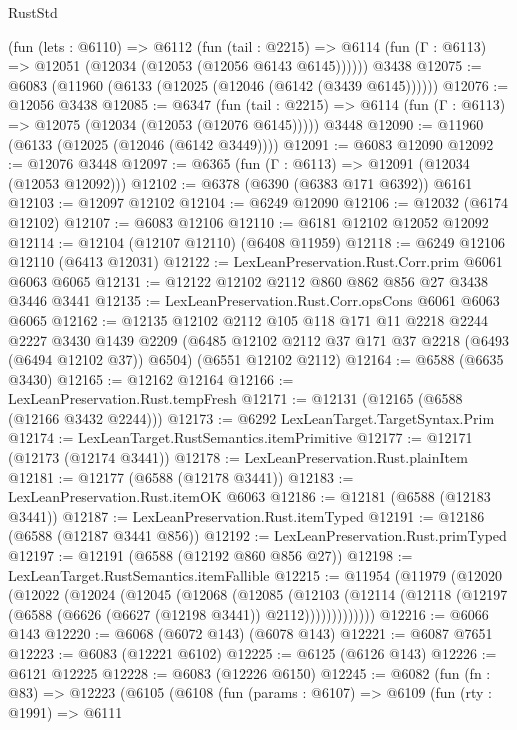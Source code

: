 \begin{lexlean}{RustStd}
\begin{coremodule}
    (fun (lets : @6110) =>
    @6112
      (fun (tail : @2215) =>
      @6114 (fun (Γ : @6113) => @12051 (@12034 (@12053 (@12056 @6143 @6145))))))
    @3438
@12075 := @6083 (@11960 (@6133 (@12025 (@12046 (@6142 (@3439 @6145))))))
@12076 := @12056 @3438
@12085 := @6347
    (fun (tail : @2215) => @6114 (fun (Γ : @6113) => @12075 (@12034 (@12053 (@12076 @6145)))))
    @3448
@12090 := @11960 (@6133 (@12025 (@12046 (@6142 @3449))))
@12091 := @6083 @12090
@12092 := @12076 @3448
@12097 := @6365 (fun (Γ : @6113) => @12091 (@12034 (@12053 @12092)))
@12102 := @6378 (@6390 (@6383 @171 @6392)) @6161
@12103 := @12097 @12102
@12104 := @6249 @12090
@12106 := @12032 (@6174 @12102)
@12107 := @6083 @12106
@12110 := @6181 @12102 @12052 @12092
@12114 := @12104 (@12107 @12110) (@6408 @11959)
@12118 := @6249 @12106 @12110 (@6413 @12031)
@12122 := LexLeanPreservation.Rust.Corr.prim @6061 @6063 @6065
@12131 := @12122 @12102 @2112 @860 @862 @856 @27 @3438 @3446 @3441
@12135 := LexLeanPreservation.Rust.Corr.opsCons @6061 @6063 @6065
@12162 := @12135
    @12102
    @2112
    @105
    @118
    @171
    @11
    @2218
    @2244
    @2227
    @3430
    @1439
    @2209
    (@6485 @12102 @2112 @37 @171 @37 @2218 (@6493 (@6494 @12102 @37)) @6504)
    (@6551 @12102 @2112)
@12164 := @6588 (@6635 @3430)
@12165 := @12162 @12164
@12166 := LexLeanPreservation.Rust.tempFresh
@12171 := @12131 (@12165 (@6588 (@12166 @3432 @2244)))
@12173 := @6292 LexLeanTarget.TargetSyntax.Prim
@12174 := LexLeanTarget.RustSemantics.itemPrimitive
@12177 := @12171 (@12173 (@12174 @3441))
@12178 := LexLeanPreservation.Rust.plainItem
@12181 := @12177 (@6588 (@12178 @3441))
@12183 := LexLeanPreservation.Rust.itemOK @6063
@12186 := @12181 (@6588 (@12183 @3441))
@12187 := LexLeanPreservation.Rust.itemTyped
@12191 := @12186 (@6588 (@12187 @3441 @856))
@12192 := LexLeanPreservation.Rust.primTyped
@12197 := @12191 (@6588 (@12192 @860 @856 @27))
@12198 := LexLeanTarget.RustSemantics.itemFallible
@12215 := @11954
    (@11979
      (@12020
        (@12022
          (@12024
            (@12045
              (@12068
                (@12085
                  (@12103
                    (@12114 (@12118 (@12197 (@6588 (@6626 (@6627 (@12198 @3441)) @2112)))))))))))))
@12216 := @6066 @143
@12220 := @6068 (@6072 @143) (@6078 @143)
@12221 := @6087 @7651
@12223 := @6083 (@12221 @6102)
@12225 := @6125 (@6126 @143)
@12226 := @6121 @12225
@12228 := @6083 (@12226 @6150)
@12245 := @6082
    (fun (fn : @83) =>
    @12223
      (@6105
        (@6108
          (fun (params : @6107) =>
          @6109
            (fun (rty : @1991) =>
            @6111

\end{coremodule}
\end{lexlean}

